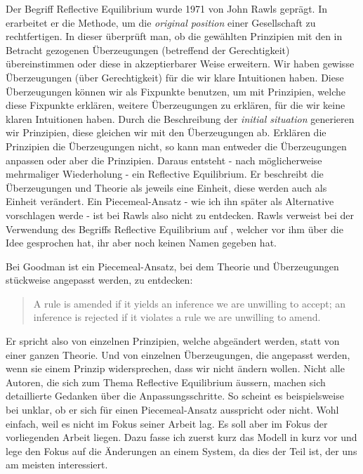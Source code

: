 \documentclass{article}
\begin{document}
Der Begriff Reflective Equilibrium wurde 1971 von John Rawls geprägt. In \autocite{rawls_theory_1971} erarbeitet er die Methode, um die \textit{original position} einer Gesellschaft zu rechtfertigen. In dieser überprüft man, ob die gewählten Prinzipien mit den in Betracht gezogenen Überzeugungen (betreffend der Gerechtigkeit) übereinstimmen oder diese in akzeptierbarer Weise erweitern. Wir haben gewisse Überzeugungen (über Gerechtigkeit) für die wir klare Intuitionen haben. Diese Überzeugungen können wir als Fixpunkte benutzen, um mit Prinzipien, welche diese Fixpunkte erklären, weitere Überzeugungen zu erklären, für die wir keine klaren Intuitionen haben. Durch die Beschreibung der \textit{initial situation} generieren wir Prinzipien, diese gleichen wir mit den Überzeugungen ab. Erklären die Prinzipien die Überzeugungen nicht, so kann man entweder die Überzeugungen anpassen oder aber die Prinzipien. Daraus entsteht - nach möglicherweise mehrmaliger Wiederholung - ein Reflective Equilibrium. Er beschreibt die Überzeugungen und Theorie als jeweils eine Einheit, diese werden auch als Einheit verändert. Ein Piecemeal-Ansatz - wie ich ihn später als Alternative vorschlagen werde - ist bei Rawls also nicht zu entdecken. Rawls verweist bei der Verwendung des Begriffs Reflective Equilibrium auf \cite{goodman_fact_1983}, welcher vor ihm über die Idee gesprochen hat, ihr aber noch keinen Namen gegeben hat. \autocite[S.~20]{rawls_theory_1971}

Bei Goodman ist ein Piecemeal-Ansatz, bei dem Theorie und Überzeugungen stückweise angepasst werden, zu entdecken:

\begin{quote}
    A rule is amended if it yields an inference we are unwilling to accept; an inference is rejected if it violates a rule we are unwilling to amend. \autocite[S.~64]{goodman_fact_1983}
\end{quote}

Er spricht also von einzelnen Prinzipien, welche abgeändert werden, statt von einer ganzen Theorie. Und von einzelnen Überzeugungen, die angepasst werden, wenn sie einem Prinzip widersprechen, dass wir nicht ändern wollen. Nicht alle Autoren, die sich zum Thema Reflective Equilibrium äussern, machen sich detaillierte Gedanken über die Anpassungsschritte. So scheint es beispielsweise bei \autocite{tersman_reflective_1993} unklar, ob er sich für einen Piecemeal-Ansatz ausspricht oder nicht. Wohl einfach, weil es nicht im Fokus seiner Arbeit lag. Es soll aber im Fokus der vorliegenden Arbeit liegen. Dazu fasse ich zuerst kurz das Modell in \autocite{beisbart_making_2021} kurz vor und lege den Fokus auf die Änderungen an einem System, da dies der Teil ist, der uns am meisten interessiert.
\end{document}
